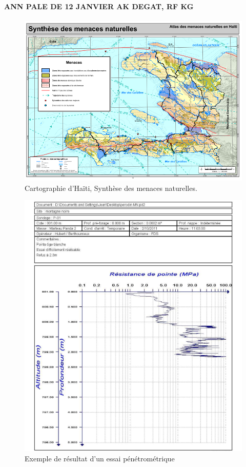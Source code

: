 \paragraph{ANN PALE DE 12 JANVIER AK DEGAT, RF KG}

\begin{figure}
    \centering
    \includegraphics[width=1\textwidth]{images/Contexte/haiti.png}
    \caption{Cartographie d'Haïti, Synthèse des menaces naturelles.}
    \label{fig:haiti}
\end{figure}

\begin{figure}
    \centering
    \includegraphics[width=1\textwidth]{images/Contexte/penetrographe.png}
    \caption{Exemple de résultat d'un essai pénétrométrique}
    \label{fig:test_penetrometrique}
\end{figure}
